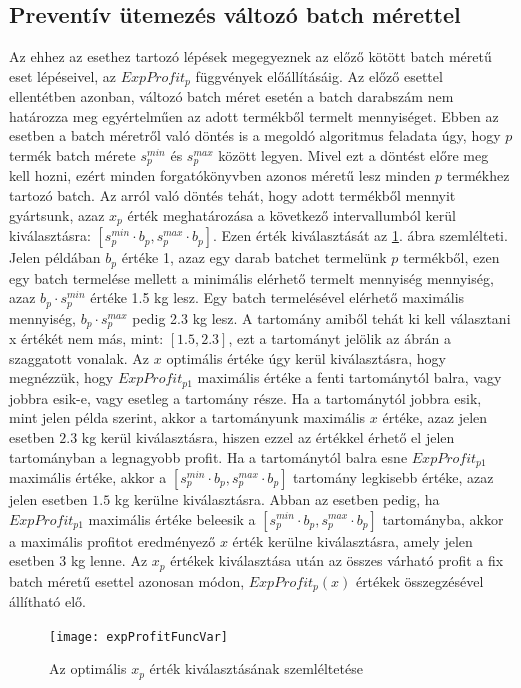 \subsection{Preventív ütemezés változó batch mérettel} \label{variable_batch_size_modell}
Az ehhez az esethez tartozó lépések megegyeznek az előző kötött batch méretű eset lépéseivel, az $ExpProfit_p$ függvények előállításáig.
Az előző esettel ellentétben azonban, változó batch méret esetén a batch darabszám nem határozza meg egyértelműen az adott termékből termelt mennyiséget. 
Ebben az esetben a batch méretről való döntés is a megoldó algoritmus feladata úgy, hogy $p$ termék batch mérete $s_p^{min}$ és $s_p^{max}$ között legyen.
Mivel ezt a döntést előre meg kell hozni, ezért minden forgatókönyvben azonos méretű lesz minden $p$ termékhez tartozó batch.
Az arról való döntés tehát, hogy adott termékből mennyit gyártsunk, azaz $x_p$ érték meghatározása a következő intervallumból kerül kiválasztásra: $[s_p^{min} \cdot b_p , s_p^{max} \cdot b_p]$.
Ezen érték kiválasztását az \ref{expProfit_func_var}. ábra szemlélteti.
Jelen példában $b_p$ értéke 1, azaz egy darab batchet termelünk $p$ termékből, ezen egy batch termelése mellett a minimális elérhető  termelt mennyiség mennyiség, azaz $b_p \cdot s_p^{min}$ értéke 1.5 kg lesz.
Egy batch termelésével elérhető maximális mennyiség, $b_p \cdot s_p^{max}$ pedig 2.3 kg lesz.
A tartomány amiből tehát ki kell választani x értékét nem más, mint: $[1.5 , 2.3]$, ezt a tartományt jelölik az ábrán a szaggatott vonalak.
Az $x$ optimális értéke úgy kerül kiválasztásra, hogy megnézzük, hogy $ExpProfit_{p1}$ maximális értéke a fenti tartománytól balra, vagy jobbra esik-e, vagy esetleg a tartomány része.
Ha a tartománytól jobbra esik, mint jelen példa szerint, akkor a tartományunk maximális $x$ értéke, azaz jelen esetben $2.3$ kg kerül kiválasztásra, hiszen ezzel az értékkel érhető el jelen tartományban a legnagyobb profit.
Ha a tartománytól balra esne $ExpProfit_{p1}$ maximális értéke, akkor a $[s_p^{min} \cdot b_p , s_p^{max} \cdot b_p]$ tartomány legkisebb értéke, azaz jelen esetben $1.5$ kg kerülne kiválasztásra.
Abban az esetben pedig, ha $ExpProfit_{p1}$ maximális értéke beleesik a $[s_p^{min} \cdot b_p , s_p^{max} \cdot b_p]$ tartományba, akkor a maximális profitot eredményező $x$ érték kerülne kiválasztásra, amely jelen esetben 3 kg lenne.
Az $x_p$ értékek kiválasztása után az összes várható profit a fix batch méretű esettel azonosan módon, $ExpProfit_p(x)$ értékek összegzésével állítható elő. 
\begin{figure}[H]
\begin{center}
\texttt{[image: expProfitFuncVar]}
\caption{Az optimális $x_p$ érték kiválasztásának szemléltetése}
\label{expProfit_func_var}
\end{center}
\end{figure}
